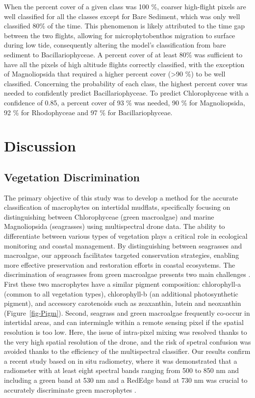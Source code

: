 \documentclass[
  number]{elsarticle}
\begin{document}
When the percent cover of a given class was 100 \%, coarser high-flight
pixels are well classified for all the classes except for Bare Sediment,
which was only well classified 80\% of the time. This phenomenon is
likely attributed to the time gap between the two flights, allowing for
microphytobenthos migration to surface during low tide, consequently
altering the model's classification from bare sediment to
Bacillariophyceae. A percent cover of at least 80\% was sufficient to
have all the pixels of high altitude flights correctly classified, with
the exception of Magnoliopsida that required a higher percent cover
(\textgreater90 \%) to be well classified. Concerning the probability of
each class, the highest percent cover was needed to confidently predict
Bacillariophyceae. To predict Chlorophyceae with a confidence of 0.85, a
percent cover of 93 \% was needed, 90 \% for Magnoliopsida, 92 \% for
Rhodophyceae and 97 \% for Bacillariophyceae.

\section{Discussion}\label{discussion}

\subsection{Vegetation Discrimination}\label{vegetation-discrimination}

The primary objective of this study was to develop a method for the
accurate classification of macrophytes on intertidal mudflats,
specifically focusing on distinguishing between Chlorophyceae (green
macroalgae) and marine Magnoliopsida (seagrasses) using multispectral
drone data. The ability to differentiate between various types of
vegetation plays a critical role in ecological monitoring and coastal
management. By distinguishing between seagrasses and macroalgae, our
approach facilitates targeted conservation strategies, enabling more
effective preservation and restoration efforts in coastal ecosystems.
The discrimination of seagrasses from green macroalgae presents two main
challenges \citetext{\citealp[ ]{oiry2021using}; \citealp[
]{bannari2022}; \citealp{veettil2020opportunities}}. First these two
macrophytes have a similar pigment composition: chlorophyll-a (common to
all vegetation types), chlorophyll-b (an additional photosynthetic
pigment), and accessory carotenoids such as zeaxanthin, lutein and
neoxanthin (Figure~\ref{fig-Pigm}). Second, seagrass and green
macroalgae frequently co-occur in intertidal areas, and can intermingle
within a remote sensing pixel if the spatial resolution is too low.
Here, the issue of intra-pixel mixing was resolved thanks to the very
high spatial resolution of the drone, and the risk of spetral confusion
was avoided thanks to the efficiency of the multispectral classifier.
Our results confirm a recent study based on in situ radiometry, where it
was demonstrated that a radiometer with at least eight spectral bands
ranging from 500 to 850 nm and including a green band at 530 nm and a
RedEdge band at 730 nm was crucial to accurately discriminate green
macrophytes \citep{Davies2023}.
\end{document}
